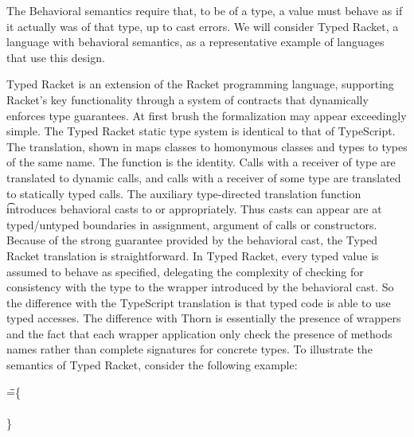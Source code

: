 \documentclass{tex/llncs}
\begin{document}
The Behavioral semantics require that, to be of a type, a value must  behave
as if it actually was of that type, up to cast errors. We will consider Typed
Racket, a language with behavioral semantics, as a representative example of
languages that use this design.

Typed Racket is an extension of the Racket programming language, supporting
Racket's key functionality through a system of contracts that dynamically
enforces type guarantees.  At first brush the formalization may appear
exceedingly simple.  The Typed Racket static type system is identical to
that of TypeScript. The translation, shown in  maps classes to
homonymous classes and types to types of the same name. The  function
is the identity.  Calls with a receiver of type \any are translated to
\kafka dynamic calls, and calls with a receiver of some type \C are
translated to statically typed calls. The auxiliary type-directed
translation function \TAG\e\Env\t introduces behavioral casts to \any or \C
appropriately. Thus casts can appear are at typed/untyped boundaries in
assignment, argument of calls or constructors. Because of the strong
guarantee provided by the behavioral cast, the Typed Racket translation is
straightforward. In Typed Racket, every typed value is assumed to behave as
specified, delegating the complexity of checking for consistency with the
type to the wrapper introduced by the behavioral cast.  So the difference
with the TypeScript translation is that typed code is able to use typed
accesses. The difference with Thorn is essentially the presence of wrappers
and the fact that each wrapper application only check the presence of
methods names rather than complete signatures for concrete types.  To
illustrate the semantics of Typed Racket, consider the following example:

\medskip
\begin{minipage}{\textwidth}
\begin{tabbing}
 \HS
  \Call{\New\A{}}\m{\New\C{}}
  \HS\HS\HS \WHERE \HS\K\HS=\HS\=
  \class\=  \A \{ \\
  \>\HS \Mdef\m\x\any\any{ ~ \Call{\New\D{}}\m\x ~} \\
  \> \}\\
 \> \Class \C{}{\Mdef\m\x\any\any{~\x~}} \\
 \> \Class \D{}{\Mdef\m\x\D\D{~\Call\x\m\x~}} \\
\end{tabbing}
\end{minipage}
\medskip
\end{document}
